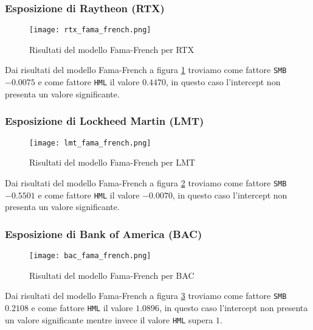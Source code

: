 \subsubsection{Esposizione di Raytheon (RTX)}

\begin{figure}[ht]
    \centering
    \texttt{[image: rtx\_fama\_french.png]}
    \caption{Risultati del modello Fama-French per RTX}
    \label{fig:rtx_fama_french}
\end{figure}

Dai risultati del modello Fama-French a figura \ref{fig:rtx_fama_french} troviamo come fattore \verb|SMB| $-0.0075$ e come fattore \verb|HML| il valore $0.4470$, 
in questo caso l'intercept non presenta un valore significante.

\pagebreak

\subsubsection{Esposizione di Lockheed Martin (LMT)}

\begin{figure}[ht]
    \centering
    \texttt{[image: lmt\_fama\_french.png]}
    \caption{Risultati del modello Fama-French per LMT}
    \label{fig:lmt_fama_french}
\end{figure}

Dai risultati del modello Fama-French a figura \ref{fig:lmt_fama_french} troviamo come fattore \verb|SMB| $-0.5501$ e come fattore \verb|HML| il valore $-0.0070$, 
in questo caso l'intercept non presenta un valore significante.

\subsubsection{Esposizione di Bank of America (BAC)}

\begin{figure}[ht]
    \centering
    \texttt{[image: bac\_fama\_french.png]}
    \caption{Risultati del modello Fama-French per BAC}
    \label{fig:bac_fama_french}
\end{figure}

Dai risultati del modello Fama-French a figura \ref{fig:bac_fama_french} troviamo come fattore \verb|SMB| $0.2108$ e come fattore \verb|HML| il valore $1.0896$, 
in questo caso l'intercept non presenta un valore significante mentre invece il valore \verb|HML| supera $1$.

